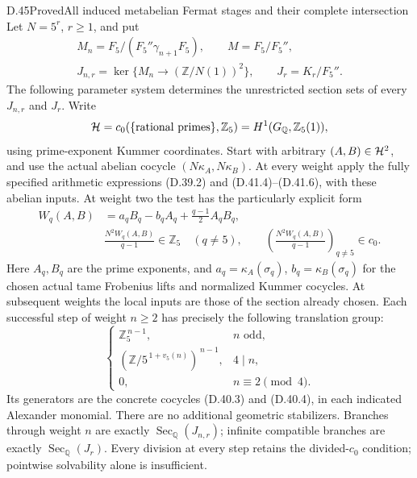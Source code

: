 \begin{statement}{D.45}{Proved}{All induced metabelian Fermat stages and their complete intersection}
Let \(N=5^r\), \(r\ge1\), and put
\[
 \begin{gathered}
 M_n=F_5/(F_5''\gamma_{n+1}F_5),\qquad
 M=F_5/F_5'',\\
 J_{n,r}=\ker\{M_n\longrightarrow(\mathbb Z/N(1))^2\},
 \qquad
 J_r=K_r/F_5''.
 \end{gathered}
\]
The following parameter system determines the unrestricted
section sets of every \(J_{n,r}\) and \(J_r\).
Write
\[
 {\cal H}=c_0(\{\hbox{rational primes}\},\mathbb Z_5)
       =H^1(G_{\mathbb Q},\mathbb Z_5(1)),
\]
using prime-exponent Kummer coordinates. Start with arbitrary
\((A,B)\in{\cal H}^2\), and use the actual abelian
cocycle \((N\kappa_A,N\kappa_B)\). At every weight apply
the fully specified arithmetic expressions (D.39.2) and
(D.41.4)--(D.41.6), with these abelian inputs.
At weight two the test has the particularly explicit form
\[
 \begin{split}
 W_q(A,B)&=
       a_q B_q-b_q A_q+\frac{q-1}{2}A_qB_q,\\
 &\frac{N^2 W_q(A,B)}{q-1}\in\mathbb Z_5
                           \quad(q\ne5),\qquad
 \left(\frac{N^2 W_q(A,B)}{q-1}\right)_{q\ne5}
                                      \in c_0.
 \end{split}                                                   \tag{D.45.1}
\]
Here \(A_q,B_q\) are the prime exponents, and
\(a_q=\kappa_A(\sigma_q)\), \(b_q=\kappa_B(\sigma_q)\)
for the chosen actual tame Frobenius lifts and normalized
Kummer cocycles. At subsequent weights the local inputs
are those of the section already chosen. Each successful
step of weight \(n\ge2\) has precisely the following
translation group:
\[
 \begin{cases}
  \mathbb Z_5^{\,n-1},&n\text{ odd},\\
  (\mathbb Z/5^{\,1+v_5(n)})^{\,n-1},&4\mid n,\\
  0,&n\equiv2\pmod4.
 \end{cases}                                                   \tag{D.45.2}
\]
Its generators are the concrete cocycles (D.40.3) and
(D.40.4), in each indicated Alexander monomial.
There are no additional geometric stabilizers.
Branches through weight \(n\) are exactly
\(\operatorname{Sec}_{\mathbb Q}(J_{n,r})\);
infinite compatible branches are exactly
\(\operatorname{Sec}_{\mathbb Q}(J_r)\).
Every division at every step retains the divided-\(c_0\)
condition; pointwise solvability alone is insufficient.


\end{statement}
